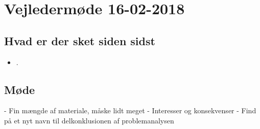 \newpage
\section{Vejledermøde 16-02-2018}
\subsection{Hvad er der sket siden sidst}
    \begin{itemize}
        \item .
    \end{itemize}
\subsection{Møde}
- Fin mængde af materiale, måske lidt meget
- Interesser og konsekvenser
- Find på et nyt navn til delkonklusionen af problemanalysen

